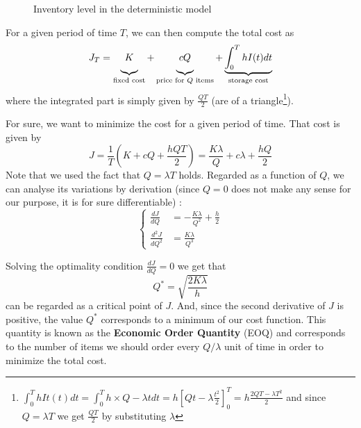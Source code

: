 \begin{figure}[h!]
    \centering
    \caption{\label{continuous:triangles}Inventory level in the deterministic model}
\end{figure}

For a given period of time $T$, we can then compute the total cost as
    \[ J_T = 
        \underbrace{\vphantom{\int}K}_{\textrm{fixed cost}}
        +
        \underbrace{\vphantom{\int}cQ}_{\textrm{price for }Q\textrm{ items}}
        +
        \underbrace{\int_0^T hI(t)dt}_\textrm{storage cost}
    \]
where the integrated part is simply given by $\frac{QT}{2}$ (are of a triangle\footnote{$\int_0^ThIt(t)dt = \int_0^T h\times Q-\lambda t dt = h[Qt-\lambda \frac{t^2}2 ]_0^T = h\frac{2QT-\lambda T^2}{2}$ and since $Q=\lambda T$ we get $\frac{QT}{2}$ by substituting $\lambda$}). 

For sure, we want to minimize the cost for a given period of time. That cost is given by \[ J = \frac{1}{T}\left( K + cQ + \frac{hQT}{2} \right) = \frac{K\lambda}Q + c\lambda + \frac{hQ}{2} \]
Note that we used the fact that $Q = \lambda T$ holds. Regarded as a function of $Q$, we can analyse its variations by derivation (since $Q=0$ does not make any sense for our purpose, it is for sure differentiable) : 
\[
    \begin{cases}
        \frac{dJ}{dQ} &= -\frac{K\lambda}{Q^2} + \frac{h}{2} \\
        \frac{d^2J}{dQ^2} &= \frac{K\lambda}{Q^3}
    \end{cases}
\]

Solving the optimality condition $\frac{dJ}{dQ} = 0$ we get that \[Q^* = \sqrt{ \frac{2K\lambda}{h} } \] can be regarded as a critical point of $J$. And, since the second derivative of $J$ is positive, the value $Q^*$ corresponds to a minimum of our cost function. This quantity is known as the \textbf{Economic Order Quantity} (EOQ) and corresponds to the number of items we should order every $Q/\lambda$ unit of time in order to minimize the total cost. 


